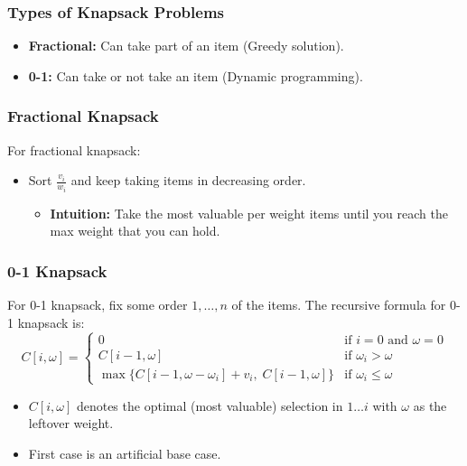 \subsubsection{Types of Knapsack Problems}
\begin{definition}
    \begin{itemize}
        \item \textbf{Fractional:} Can take part of an item (Greedy solution).
        \item \textbf{0-1:} Can take or not take an item (Dynamic programming).
    \end{itemize}
\end{definition}

\subsubsection{Fractional Knapsack}
\begin{definition}
For fractional knapsack:
\begin{itemize}
    \item Sort $\frac{v_i}{w_i}$ and keep taking items in decreasing order.
    \begin{itemize}
        \item \textbf{Intuition:} Take the most valuable per weight items until you reach the max weight that you can hold.
    \end{itemize}
\end{itemize}
\end{definition}

\subsubsection{0-1 Knapsack}
\begin{definition}
    For 0-1 knapsack, fix some order $1, \dots, n$ of the items. The recursive formula for 0-1 knapsack is:
    \[
    C[i, \omega] = \begin{cases} 
        0 & \text{if } i = 0 \text{ and } \omega = 0 \\
        C[i-1, \omega] & \text{if } \omega_i > \omega \\
        \max \{C[i-1, \omega - \omega_i] +v_i, \; C[i-1, \omega]\} & \text{if } \omega_i \leq \omega
    \end{cases}
    \]
    \begin{itemize}
        \item $C[i, \omega]$ denotes the optimal (most valuable) selection in $1\ldots i$ with $\omega$ as the leftover weight.
        \item First case is an artificial base case.
    \end{itemize}
\end{definition}


